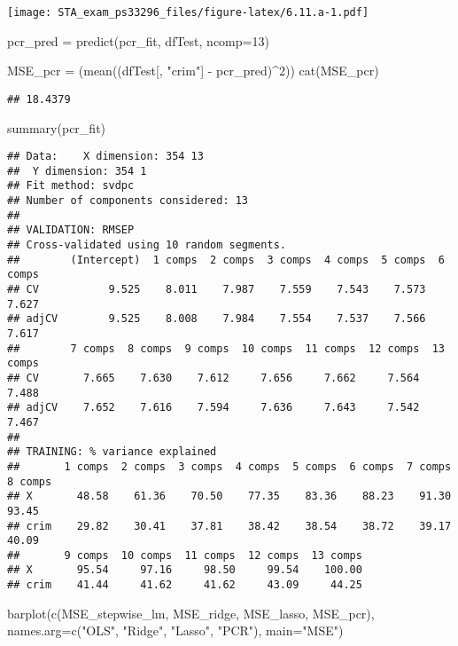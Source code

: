 \documentclass[
]{article}
\newenvironment{Shaded}{\begin{snugshade}}{\end{snugshade}}
\newcommand{\AttributeTok}[1]{\textcolor[rgb]{0.77,0.63,0.00}{#1}}
\newcommand{\DecValTok}[1]{\textcolor[rgb]{0.00,0.00,0.81}{#1}}
\newcommand{\FunctionTok}[1]{\textcolor[rgb]{0.00,0.00,0.00}{#1}}
\newcommand{\NormalTok}[1]{#1}
\newcommand{\OtherTok}[1]{\textcolor[rgb]{0.56,0.35,0.01}{#1}}
\newcommand{\SpecialCharTok}[1]{\textcolor[rgb]{0.00,0.00,0.00}{#1}}
\newcommand{\StringTok}[1]{\textcolor[rgb]{0.31,0.60,0.02}{#1}}
\begin{document}
\texttt{[image: STA\_exam\_ps33296\_files/figure-latex/6.11.a-1.pdf]}

\begin{Shaded}
\begin{Highlighting}[]
\NormalTok{pcr\_pred }\OtherTok{=} \FunctionTok{predict}\NormalTok{(pcr\_fit, dfTest, }\AttributeTok{ncomp=}\DecValTok{13}\NormalTok{)}

\NormalTok{MSE\_pcr }\OtherTok{=}\NormalTok{ (}\FunctionTok{mean}\NormalTok{((dfTest[, }\StringTok{"crim"}\NormalTok{] }\SpecialCharTok{{-}}\NormalTok{ pcr\_pred)}\SpecialCharTok{\^{}}\DecValTok{2}\NormalTok{))}
\FunctionTok{cat}\NormalTok{(MSE\_pcr)}
\end{Highlighting}
\end{Shaded}

\begin{verbatim}
## 18.4379
\end{verbatim}

\begin{Shaded}
\begin{Highlighting}[]
\FunctionTok{summary}\NormalTok{(pcr\_fit)}
\end{Highlighting}
\end{Shaded}

\begin{verbatim}
## Data:    X dimension: 354 13 
##  Y dimension: 354 1
## Fit method: svdpc
## Number of components considered: 13
## 
## VALIDATION: RMSEP
## Cross-validated using 10 random segments.
##        (Intercept)  1 comps  2 comps  3 comps  4 comps  5 comps  6 comps
## CV           9.525    8.011    7.987    7.559    7.543    7.573    7.627
## adjCV        9.525    8.008    7.984    7.554    7.537    7.566    7.617
##        7 comps  8 comps  9 comps  10 comps  11 comps  12 comps  13 comps
## CV       7.665    7.630    7.612     7.656     7.662     7.564     7.488
## adjCV    7.652    7.616    7.594     7.636     7.643     7.542     7.467
## 
## TRAINING: % variance explained
##       1 comps  2 comps  3 comps  4 comps  5 comps  6 comps  7 comps  8 comps
## X       48.58    61.36    70.50    77.35    83.36    88.23    91.30    93.45
## crim    29.82    30.41    37.81    38.42    38.54    38.72    39.17    40.09
##       9 comps  10 comps  11 comps  12 comps  13 comps
## X       95.54     97.16     98.50     99.54    100.00
## crim    41.44     41.62     41.62     43.09     44.25
\end{verbatim}

\begin{Shaded}
\begin{Highlighting}[]
\FunctionTok{barplot}\NormalTok{(}\FunctionTok{c}\NormalTok{(MSE\_stepwise\_lm, MSE\_ridge, MSE\_lasso, MSE\_pcr), }\AttributeTok{names.arg=}\FunctionTok{c}\NormalTok{(}\StringTok{"OLS"}\NormalTok{, }\StringTok{"Ridge"}\NormalTok{, }\StringTok{"Lasso"}\NormalTok{, }\StringTok{"PCR"}\NormalTok{), }\AttributeTok{main=}\StringTok{"MSE"}\NormalTok{)}
\end{Highlighting}
\end{Shaded}
\end{document}
